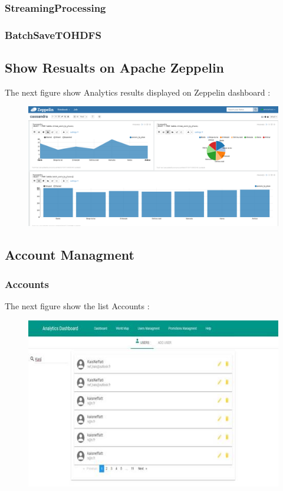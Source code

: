 \subsubsection{StreamingProcessing}
\label{sec:sec01}
\subsubsection{BatchSaveTOHDFS}
\label{sec:sec01}
\subsection{Show Resualts on Apache Zeppelin}
\label{sec:sec01}
The next figure show Analytics results displayed on Zeppelin dashboard :
\begin{figure}[h!]
	\centering
	\includegraphics[height=0.3\textheight]{fig01/zeppelin}
	\label{fig:FilialesEtClients}
\end{figure}
\subsection{Account Managment}
\label{sec:sec01}
\subsubsection{Accounts}
\label{sec:sec01}
The next figure show the list Accounts :
\begin{figure}[h!]
	\centering
	\includegraphics[height=0.3\textheight]{fig01/UserManagement}
	\label{fig:FilialesEtClients}
\end{figure}
